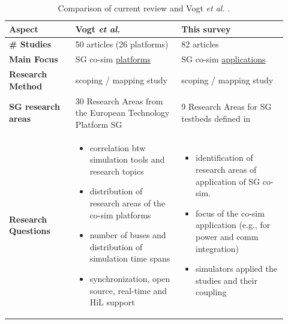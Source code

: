 \documentclass[1p]{elsarticle} %
\begin{document}
\begin{table}[!htb]
\renewcommand{\arraystretch}{1.2}
\caption{Comparison of current review and Vogt \textit{et al.} \citep{ref:vogt2018survey}.}
\label{tbl:comparison}
\footnotesize
\begin{tabular}{p{0.22\linewidth}p{0.35\linewidth}p{0.35\linewidth}}
\toprule
\textbf{Aspect} &  \textbf{Vogt \textit{et al.} \citep{ref:vogt2018survey}}&  \textbf{This survey}\\ 
\midrule
\textbf{\# Studies} & 50 articles (26 platforms)  & 82 articles \\
\textbf{Main Focus} & SG co-sim \underline{platforms}  & SG co-sim \underline{applications} \\
\textbf{Research Method} & scoping / mapping study  & scoping / mapping study \\
\textbf{SG research areas} & 30 Research Areas from the European Technology Platform SG  & 9 Research Areas for SG testbeds defined in \cite{ref:cintuglu2017survey} \\

\textbf{Research Questions} & 
\begin{itemize}
    \item correlation btw simulation tools and research topics
    \item distribution of research areas of the co-sim platforms
    \item number of buses and distribution of simulation time spans
    \item synchronization, open source, real-time and HiL support
\end{itemize} & 

\begin{itemize}
    \item identification of research areas of application of SG co-sim.
    \item focus of the co-sim application (e.g., for power and comm integration) 
    \item simulators applied the studies and their coupling
\end{itemize} 
  \\

\bottomrule
\end{tabular}
\end{table}
\end{document}
